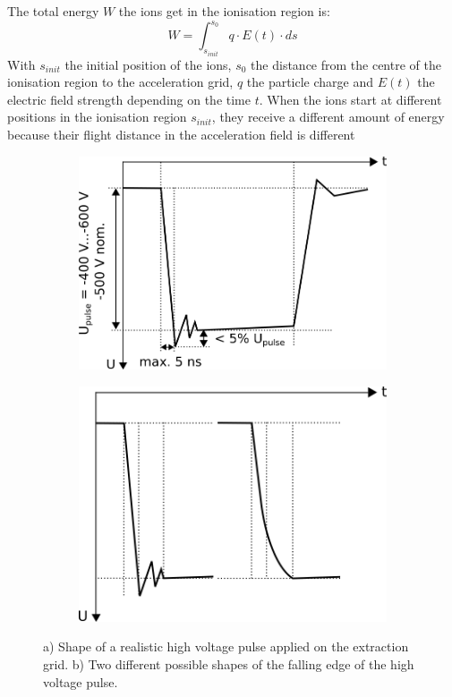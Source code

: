 	The total energy $W$ the ions get in the ionisation region is:
	\begin{equation}
		W = \int_{s_{init}}^{s_0} q\cdot E(t)\cdot ds
		\label{eq:WionsISposEt}
	\end{equation}
	With $s_{init}$ the initial position of the ions, $s_0$ the distance from the centre of the ionisation region to the acceleration grid, $q$ the particle charge and $E(t)$ the electric field strength depending on the time $t$. When the ions start at different positions in the ionisation region $s_{init}$, they receive a different amount of energy because their flight distance in the acceleration field is different
	\begin{figure}[H]
		\begin{subfigure}{0.5\textwidth}
			\centering
			\includegraphics[width=\textwidth]{Bilder/PulserShapeTheoAna.png}
			\caption{}
			\label{subfig:theoPulseShape}
		\end{subfigure}
		\begin{subfigure}{0.5\textwidth}
			\centering
			\includegraphics[width=.9\textwidth]{Bilder/PulserFallTimeShapes.png}
			\caption{}
			\label{subfig.PulserFallTimeShapes}
		\end{subfigure}
		\caption{a) Shape of a realistic high voltage pulse applied on the extraction grid. b) Two different possible shapes of the falling edge of the high voltage pulse.}
		\label{fig:theoPulseShape}
	\end{figure}

